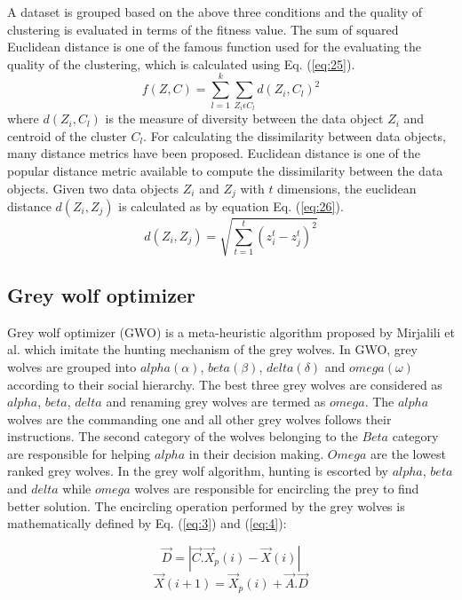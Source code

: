 \documentclass[review]{elsarticle}
\begin{document}
A dataset is grouped based on the above three conditions and the quality of clustering is evaluated in terms of the fitness value. The sum of squared Euclidean distance \cite{yang2010evolutionary}is one of the famous function used for the evaluating the quality of the clustering, which is calculated using Eq. (\ref{eq:25}).
   \begin{equation}\label{eq:25} 
   f(Z,C)=\sum_{l=1}^k\sum_{Z_i\epsilon C_l}d(Z_i,C_l)^2
   \end{equation}
where $d(Z_i,C_l)$ is the measure of diversity between the data object $Z_i$ and centroid of the cluster $C_l$. For calculating the dissimilarity between data objects, many distance metrics have been proposed. Euclidean distance is one of the popular distance metric available to compute the dissimilarity between the data objects. Given two data objects $Z_i$ and $Z_j$ with $t$ dimensions, the euclidean distance $d(Z_i,Z_j)$ is calculated as by equation Eq. (\ref{eq:26}).
   \begin{equation}\label{eq:26}
     d(Z_i,Z_j)=\sqrt{\sum_{t=1}^t(z_i^t-z_j^t)^2}
   \end{equation}
  \subsection{Grey wolf optimizer }\label{sec:GWO}
 Grey wolf optimizer (GWO) is a meta-heuristic algorithm proposed by Mirjalili et al. \cite{mirjalili2014grey} which imitate the hunting mechanism of the grey wolves. 
In GWO, grey wolves are grouped into $alpha(\alpha)$, $beta(\beta)$, $delta(\delta)$ and $omega(\omega)$ according to their social hierarchy. The best three grey wolves are considered as $alpha$, $beta$, $delta$ and renaming grey wolves are termed as $omega$. The $alpha$ wolves are the commanding one and all other grey wolves follows their instructions. The second category of the wolves belonging to the $Beta$ category are responsible for helping $alpha$ in their decision making. $Omega$ are the lowest ranked grey wolves.\newline
     In the grey wolf algorithm, hunting is escorted by $alpha$, $beta$ and $delta$ while $omega$ wolves are responsible for encircling the prey to find better solution.
   The encircling operation performed by the grey wolves is mathematically defined by Eq. (\ref{eq:3}) and (\ref{eq:4}):


 \begin{equation}\label{eq:3}
    \overrightarrow D=|\overrightarrow C.\overrightarrow X_p(i)-\overrightarrow X(i)|                           
\end{equation}   
 \begin{equation}\label{eq:4}                               
   \overrightarrow X(i+1)=\overrightarrow X_p(i)+\overrightarrow A.\overrightarrow D
\end{equation}
\end{document}
